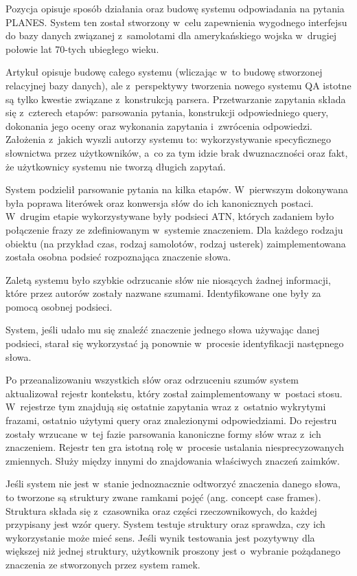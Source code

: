 Pozycja \cite{waltz1978english} opisuje sposób działania oraz budowę systemu odpowiadania na pytania PLANES. System ten został stworzony w~celu zapewnienia wygodnego interfejsu do bazy danych związanej z~samolotami dla amerykańskiego wojska w~drugiej połowie lat 70-tych ubiegłego wieku.

Artykuł \cite{waltz1978english} opisuje budowę całego systemu (wliczając w~to budowę stworzonej relacyjnej bazy danych), ale z~perspektywy tworzenia nowego systemu QA istotne są tylko kwestie związane z~konstrukcją parsera. Przetwarzanie zapytania składa się z~czterech etapów: parsowania pytania, konstrukcji odpowiedniego query, dokonania jego oceny oraz wykonania zapytania i~zwrócenia odpowiedzi. Założenia z~jakich wyszli autorzy systemu to: wykorzystywanie specyficznego słownictwa przez użytkowników, a~co za tym idzie brak dwuznaczności oraz fakt, że użytkownicy systemu nie tworzą długich zapytań.

System podzielił parsowanie pytania na kilka etapów. W~pierwszym dokonywana była poprawa literówek oraz konwersja słów do ich kanonicznych postaci. W~drugim etapie wykorzystywane były podsieci ATN, których zadaniem było połączenie frazy ze zdefiniowanym w~systemie znaczeniem. Dla każdego rodzaju obiektu (na przykład czas, rodzaj samolotów, rodzaj usterek) zaimplementowana została osobna podsieć rozpoznająca znaczenie słowa. 

Zaletą systemu było szybkie odrzucanie słów nie niosących żadnej informacji, które przez autorów \cite{waltz1978english} zostały nazwane szumami. Identyfikowane one były za pomocą osobnej podsieci. 

System, jeśli udało mu się znaleźć znaczenie jednego słowa używając danej podsieci, starał się wykorzystać ją ponownie w~procesie identyfikacji następnego słowa.

Po przeanalizowaniu wszystkich słów oraz odrzuceniu szumów system aktualizował rejestr kontekstu, który został zaimplementowany w~postaci stosu. W~rejestrze tym znajdują się ostatnie zapytania wraz z~ostatnio wykrytymi frazami, ostatnio użytymi query oraz znalezionymi odpowiedziami. Do rejestru zostały wrzucane w~tej fazie parsowania kanoniczne formy słów wraz z~ich znaczeniem. Rejestr ten gra istotną rolę w~procesie ustalania niesprecyzowanych zmiennych. Służy między innymi do znajdowania właściwych znaczeń zaimków.

Jeśli system nie jest w~stanie jednoznacznie odtworzyć znaczenia danego słowa, to tworzone są struktury zwane ramkami pojęć (ang. concept case frames). Struktura składa się z~czasownika oraz części rzeczownikowych, do każdej przypisany jest wzór query. System testuje struktury oraz sprawdza, czy ich wykorzystanie może mieć sens. Jeśli wynik testowania jest pozytywny dla większej niż jednej struktury, użytkownik proszony jest o~wybranie pożądanego znaczenia ze stworzonych przez system ramek.

